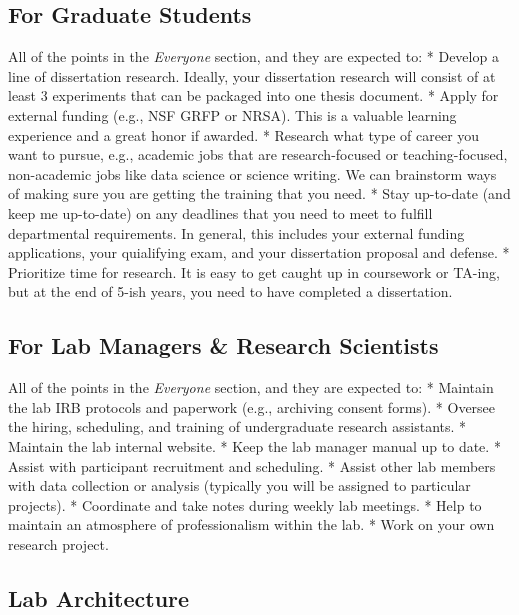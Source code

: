 \documentclass[
]{book}
\begin{document}
\hypertarget{for-graduate-students}{%
\subsection{For Graduate Students}\label{for-graduate-students}}

All of the points in the \emph{Everyone} section, and they are expected to:
* Develop a line of dissertation research. Ideally, your dissertation research will consist of at least 3 experiments that can be packaged into one thesis document.
* Apply for external funding (e.g., NSF GRFP or NRSA). This is a valuable learning experience and a great honor if awarded.
* Research what type of career you want to pursue, e.g., academic jobs that are research-focused or teaching-focused, non-academic jobs like data science or science writing. We can brainstorm ways of making sure you are getting the training that you need.
* Stay up-to-date (and keep me up-to-date) on any deadlines that you need to meet to fulfill departmental requirements. In general, this includes your external funding applications, your quialifying exam, and your dissertation proposal and defense.
* Prioritize time for research. It is easy to get caught up in coursework or TA-ing, but at the end of 5-ish years, you need to have completed a dissertation.

\hypertarget{for-lab-managers-research-scientists}{%
\subsection{For Lab Managers \& Research Scientists}\label{for-lab-managers-research-scientists}}

All of the points in the \emph{Everyone} section, and they are expected to:
* Maintain the lab IRB protocols and paperwork (e.g., archiving consent forms).
* Oversee the hiring, scheduling, and training of undergraduate research assistants.
* Maintain the lab internal website.
* Keep the lab manager manual up to date.
* Assist with participant recruitment and scheduling.
* Assist other lab members with data collection or analysis (typically you will be assigned to particular projects).
* Coordinate and take notes during weekly lab meetings.
* Help to maintain an atmosphere of professionalism within the lab.
* Work on your own research project.

\hypertarget{lab-architecture}{%
\subsection{Lab Architecture}\label{lab-architecture}}
\end{document}

